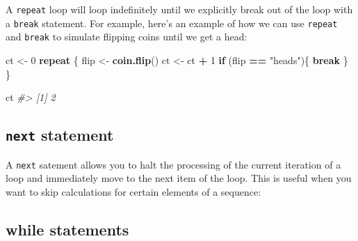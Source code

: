 \documentclass[]{book}
\newenvironment{Shaded}{\begin{snugshade}}{\end{snugshade}}
\newcommand{\CommentTok}[1]{\textcolor[rgb]{0.56,0.35,0.01}{\textit{#1}}}
\newcommand{\ControlFlowTok}[1]{\textcolor[rgb]{0.13,0.29,0.53}{\textbf{#1}}}
\newcommand{\DecValTok}[1]{\textcolor[rgb]{0.00,0.00,0.81}{#1}}
\newcommand{\KeywordTok}[1]{\textcolor[rgb]{0.13,0.29,0.53}{\textbf{#1}}}
\newcommand{\NormalTok}[1]{#1}
\newcommand{\OperatorTok}[1]{\textcolor[rgb]{0.81,0.36,0.00}{\textbf{#1}}}
\newcommand{\StringTok}[1]{\textcolor[rgb]{0.31,0.60,0.02}{#1}}
\theoremstyle{definition}
\theoremstyle{definition}
\theoremstyle{definition}
\theoremstyle{remark}
\begin{document}
A \texttt{repeat} loop will loop indefinitely until we explicitly break
out of the loop with a \texttt{break} statement. For example, here's an
example of how we can use \texttt{repeat} and \texttt{break} to simulate
flipping coins until we get a head:

\begin{Shaded}
\begin{Highlighting}[]
\NormalTok{ct <-}\StringTok{ }\DecValTok{0}
\ControlFlowTok{repeat}\NormalTok{ \{}
\NormalTok{  flip <-}\StringTok{ }\KeywordTok{coin.flip}\NormalTok{()}
\NormalTok{  ct <-}\StringTok{ }\NormalTok{ct }\OperatorTok{+}\StringTok{ }\DecValTok{1}
  \ControlFlowTok{if}\NormalTok{ (flip }\OperatorTok{==}\StringTok{ "heads"}\NormalTok{)\{}
    \ControlFlowTok{break}
\NormalTok{  \}}
\NormalTok{\}}

\NormalTok{ct}
\CommentTok{#> [1] 2}
\end{Highlighting}
\end{Shaded}

\hypertarget{next-statement}{%
\subsection{\texorpdfstring{\texttt{next}
statement}{next statement}}\label{next-statement}}

A \texttt{next} satement allows you to halt the processing of the
current iteration of a loop and immediately move to the next item of the
loop. This is useful when you want to skip calculations for certain
elements of a sequence:

\begin{Shaded}
\end{Shaded}

\hypertarget{while-statements}{%
\subsection{while statements}\label{while-statements}}
\end{document}

